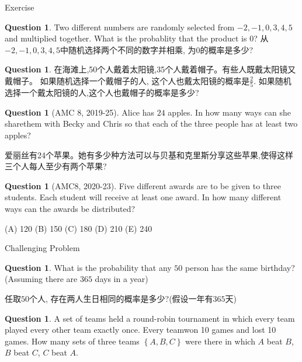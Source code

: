 \documentclass{beamer}
\theoremstyle{definition}
\newtheorem{ques}[defn]{Question}
\newcommand{\bbrace}[1]{\left\{ #1 \right\} }
\begin{document}
\begin{frame}{Exercise}
    \begin{ques}
        Two different numbers are randomly selected from $-2,-1,0,3,4,5$ and multiplied together. What is the probablity
    that the product is $0$?
    从$-2,-1,0,3,4,5$中随机选择两个不同的数字并相乘, 为0的概率是多少?
    \end{ques}
    \begin{ques}
        在海滩上,50个人戴着太阳镜,35个人戴着帽子。有些人既戴太阳镜又戴帽子。
        如果随机选择一个戴帽子的人,
        这个人也戴太阳镜的概率是$\frac{2}{5}$. 如果随机选择一个戴太阳镜的人,这个人也戴帽子的概率是多少?
    \end{ques}
\end{frame}
\begin{frame}
    \begin{ques}[AMC 8, 2019-25]
        Alice has $24$ apples. In how many ways can she sharethem with Becky and Chris so that each of the three people has at least two
        apples?

        爱丽丝有24个苹果。她有多少种方法可以与贝基和克里斯分享这些苹果,使得这样三个人每人至少有两个苹果?
    \end{ques}
    \begin{ques}[AMC8, 2020-23]
        Five different awards are to be given to three students. Each student will receive at least one award. In how many different ways can the awards be distributed?

        (A) 120 (B) 150 (C) 180 (D) 210 (E) 240
    \end{ques}
\end{frame}
\begin{frame}{Challenging Problem}
\begin{ques}
    What is the probability that any $50$ person has the same birthday? (Assuming there are $365$ days in a year)
    
    任取$50$个人, 存在两人生日相同的概率是多少?(假设一年有$365$天)
\end{ques}
\begin{ques}
    A set of teams held a round-robin tournament in which every team played every other team exactly once. Every teamwon 10 games and lost 10 games. How many
    sets of three teams $\bbrace{A,B,C}$ were there in which $A$ beat $B$, $B$ beat $C$, $C$ beat $A$.
\end{ques}

\end{frame}
\end{document}
